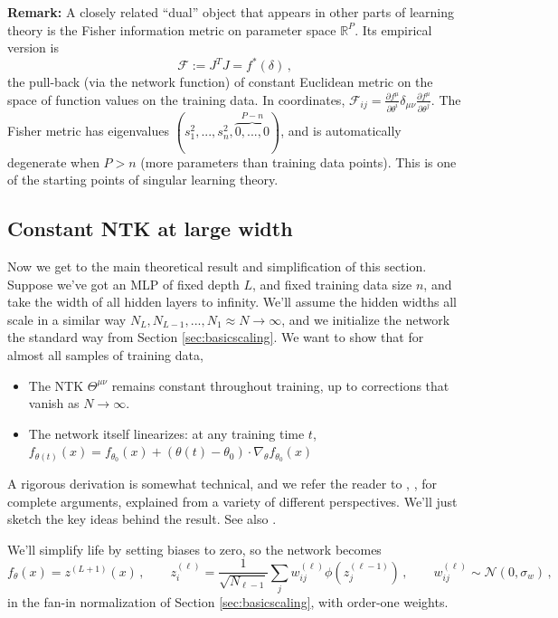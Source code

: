 \documentclass[11pt]{article}
\newcommand{\R}{\mathbb{R}}
\newcommand{\CN}{{\mathcal N}}
\newcommand{\pd}{\partial}
\begin{document}
\smallskip
\noindent\textbf{Remark:} A closely related ``dual'' object that appears in other parts of learning theory is the Fisher information metric on parameter space $\R^P$. Its empirical version is
%
\begin{equation} \mathcal F := J^TJ = f^*(\delta)\,, \end{equation}
%
the pull-back (via the network function) of constant Euclidean metric on the space of function values on the training data.
In coordinates, $\mathcal F_{ij} =\frac{\pd f^\mu}{\pd \theta^i}\delta_{\mu\nu} \frac{\pd f^\mu}{\pd \theta^j}$.
%
The Fisher metric has eigenvalues $(s_1^2,...,s_n^2,\overbrace{0,...,0}^{P-n})$, and is automatically degenerate when $P>n$ (more parameters than training data points). This is one of the starting points of singular learning theory.


\subsection{Constant NTK at large width}
\label{sec:NTK-const}

Now we get to the main theoretical result and simplification of this section. Suppose we've got an MLP of fixed depth $L$, and fixed training data size $n$, and take the width of all hidden layers to infinity. We'll assume the hidden widths all scale in a similar way $N_L,N_{L-1},...,N_1\approx N\to \infty$, and we initialize the network the standard way from Section \ref{sec:basicscaling}. We want to show that for almost all samples of training data,
\begin{itemize}
    \item The NTK $\Theta^{\mu\nu}$ remains constant throughout training, up to corrections that vanish as $N\to\infty$.
    \item The network itself linearizes: at any training time $t$, $f_{\theta(t)}(x) =f_{\theta_0}(x) + (\theta(t)-\theta_0)\cdot\nabla_\theta f_{\theta_0}(x)$
\end{itemize}

A rigorous derivation is somewhat technical, and we refer the reader to \cite{du2019gradient,jacot2018neural}, \cite[Ch. 11]{roberts2022principles}, \cite[Ch. 20]{spiliopoulos2025foundations} for complete arguments, explained from a variety of different perspectives. We'll just sketch the key ideas behind the result. See also \cite[Lecture 3]{hanin2026mdl}.

We'll simplify life by setting biases to zero, so the network becomes
%
\begin{equation}  f_\theta(x) = z^{(L+1)}(x)\,,\qquad z^{(\ell)}_i = \frac{1}{\sqrt{N_{\ell-1}}}\sum_j w_{ij}^{(\ell)} \phi(z_j^{(\ell-1)})\,,\qquad w^{(\ell)}_{ij}\sim\CN(0,\sigma_w)\,,
\end{equation}
%
in the fan-in normalization of Section \ref{sec:basicscaling}, with order-one weights.
\end{document}

